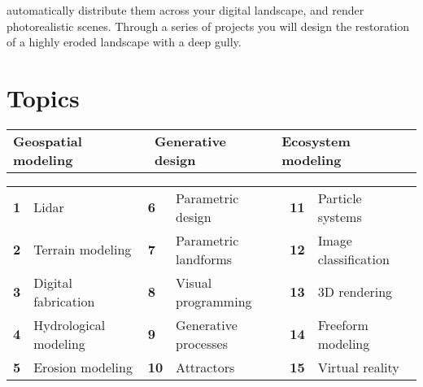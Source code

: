\documentclass[11pt,article,oneside]{memoir}
\begin{document}
automatically distribute them across your digital landscape,
and render photorealistic scenes.
Through a series of projects you will design the restoration 
of a highly eroded landscape with a deep gully.\\


\section{Topics}
%
\begin{table}[H]
\begin{tabular}{l @{\hskip 1.25cm} l @{\hskip 1.8cm} l}
\textbf{Geospatial modeling} & \textbf{Generative design} & \textbf{Ecosystem modeling}\\
\end{tabular}
\end{table}
%
\vspace*{-1em}
%
\begin{table}[H]
\begin{tabular}{l l l l l l}
\small
\textbf{1} & Lidar & \textbf{6} & Parametric design & \textbf{11} & Particle systems\\
\textbf{2} & Terrain modeling & \textbf{7} & Parametric landforms & \textbf{12} & Image classification\\
\textbf{3} & Digital fabrication & \textbf{8} & Visual programming & \textbf{13} & 3D rendering\\
\textbf{4} & Hydrological modeling & \textbf{9} & Generative processes & \textbf{14} & Freeform modeling\\
\textbf{5} & Erosion modeling & \textbf{10} & Attractors & \textbf{15} & Virtual reality\\
\end{tabular}
\end{table}
%


\clearpage
\end{document}
